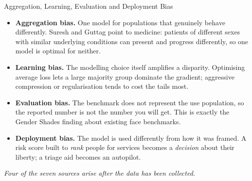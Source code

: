 
\begin{frame}{Aggregation, Learning, Evaluation and Deployment Bias}

    \begin{itemize}
        \setlength\itemsep{0.7em}
        \item \textbf{Aggregation bias.} One model for populations that genuinely behave
              differently. Suresh and Guttag point to medicine: patients of different sexes with
              similar underlying conditions can present and progress differently, so one model is
              optimal for neither.

        \item \textbf{Learning bias.} The modelling choice itself amplifies a disparity.
              Optimising average loss lets a large majority group dominate the gradient;
              aggressive compression or regularisation tends to cost the tails most.

        \item \textbf{Evaluation bias.} The benchmark does not represent the use population,
              so the reported number is not the number you will get. This is exactly the
              Gender Shades finding about existing face benchmarks.

        \item \textbf{Deployment bias.} The model is used differently from how it was framed.
              A risk score built to \emph{rank} people for services becomes a
              \emph{decision} about their liberty; a triage aid becomes an autopilot.
    \end{itemize}

    \vspace{0.4em}
    \centering
    \textit{Four of the seven sources arise \emph{after} the data has been collected.}
\end{frame}
